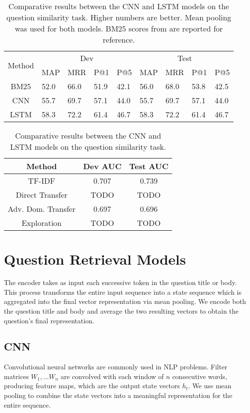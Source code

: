\documentclass[11pt,a4paper]{article}
\begin{document}
\begin{table*}[!ht]
\centering
\begin{tabular}{c|p{1cm}|p{1cm}|p{1cm}|p{1cm}|p{1cm}|p{1cm}|p{1cm}|p{1cm}}
\hline
\multirow{2}{*}{Method} & \multicolumn{4}{c}{Dev} \vline & \multicolumn{4}{c}{Test} \\  
\cline{2-9} 
& MAP & MRR & P@1 & P@5 & MAP & MRR & P@1 & P@5\\ \hline
BM25 \cite{lei} & 52.0 & 66.0 & 51.9 & 42.1 & 56.0 & 68.0 & 53.8 & 42.5 \\
CNN & 55.7 & 69.7 & 57.1 & 44.0 & 55.7 & 69.7 & 57.1 & 44.0 \\
LSTM & 58.3 & 72.2 & 61.4 & 46.7 & 58.3 & 72.2 & 61.4 & 46.7\\
\hline
\end{tabular}
\caption{Comparative results between the CNN and LSTM models on the question similarity task. Higher numbers are better. Mean pooling was used for both models. BM25 scores from \cite{lei} are reported for reference.}
\label{table2}
\end{table*}

\begin{table}
\centering
\begin{tabular}{ccc}
\hline
Method & Dev AUC & Test AUC \\
\hline
TF-IDF & 0.707 & 0.739 \\
Direct Transfer & TODO & TODO \\
Adv. Dom. Transfer & 0.697 & 0.696 \\
Exploration & TODO & TODO \\
\hline
\end{tabular}
\caption{Comparative results between the CNN and LSTM models on the question similarity task. }
\label{table3}
\end{table}

\section{Question Retrieval Models}
The encoder takes as input each successive token in the question title or body. This process transforms the entire input sequence into a state sequence which is aggregated into the final vector representation via mean pooling. We encode both the question title and body and average the two resulting vectors to obtain the question’s final representation.

\subsection*{CNN}
Convolutional neural networks \cite{lecun} are commonly used in NLP problems. Filter matrices $W_1,...W_n$ are convolved with each window of $n$ consecutive words, producing feature maps, which are the output state vectors $h_t$. We use mean pooling to combine the state vectors into a meaningful representation for the entire sequence.
\end{document}
